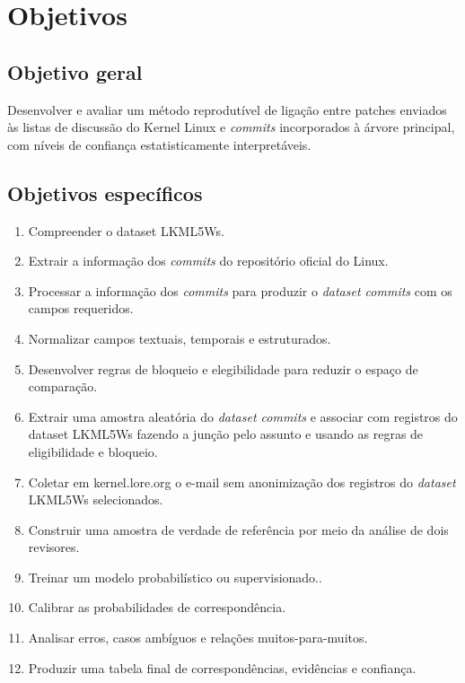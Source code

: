 
\chapter{Objetivos}

\section{Objetivo geral}

Desenvolver e avaliar um método reprodutível de ligação entre patches enviados às listas de discussão do Kernel Linux e \textit{commits} incorporados à árvore principal, com níveis de confiança estatisticamente interpretáveis.

\section{Objetivos específicos}

\begin{enumerate}
	\item Compreender o dataset LKML5Ws.
	\item Extrair a informação dos \textit{commits} do repositório oficial do Linux.
	\item Processar a informação dos \textit{commits} para produzir o \textit{dataset commits} com os campos requeridos.
	\item Normalizar campos textuais, temporais e estruturados.
	\item Desenvolver regras de bloqueio e elegibilidade para reduzir o espaço de comparação.
	\item Extrair uma amostra aleatória do \textit{dataset commits} e associar com registros do dataset LKML5Ws fazendo a junção pelo assunto e usando as regras de eligibilidade e bloqueio.
	\item Coletar em kernel.lore.org o e-mail sem anonimização dos registros do \textit{dataset} LKML5Ws selecionados.
	\item Construir uma amostra de verdade de referência por meio da análise de dois revisores.
	\item Treinar um modelo probabilístico ou supervisionado..
	\item Calibrar as probabilidades de correspondência.
	\item Analisar erros, casos ambíguos e relações muitos-para-muitos.
	\item Produzir uma tabela final de correspondências, evidências e confiança.	
\end{enumerate}

